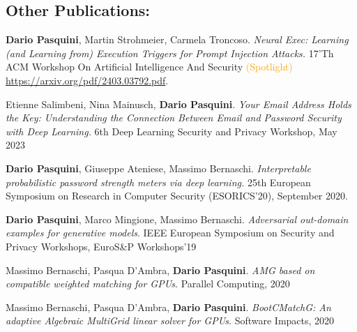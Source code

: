 \documentclass[margin, 10pt]{article} %
\begin{document}



	
\subsection*{Other Publications:}
\vspace{.5cm}


\begin{thebibliography}{99}
\setcounter{enumiv}{7} 

	\textbf{Dario Pasquini},  Martin Strohmeier, Carmela Troncoso. \textit{Neural Exec: Learning (and Learning from) Execution Triggers for Prompt Injection Attacks.} 17'Th ACM Workshop On Artificial Intelligence And Security \textcolor{orange}{(Spotlight)} \url{https://arxiv.org/pdf/2403.03792.pdf}.

	
	Etienne Salimbeni, Nina Mainusch, \textbf{Dario Pasquini}. \textit{Your Email Address Holds the Key: Understanding the Connection Between Email and Password Security with Deep Learning.} 6th Deep Learning Security and Privacy Workshop, May 2023

\textbf{Dario Pasquini}, Giuseppe Ateniese, Massimo Bernaschi. \textit{Interpretable probabilistic password strength meters via deep learning.}  25th European Symposium on Research in Computer Security (\mbox{ESORICS}'20), September 2020. 

  \textbf{Dario Pasquini}, Marco Mingione,  Massimo Bernaschi. \textit{Adversarial out-domain examples for generative models}. IEEE European Symposium on Security and Privacy Workshops, EuroS\&P Workshops'19

Massimo Bernaschi, Pasqua D’Ambra,  \textbf{Dario Pasquini}.\textit{ AMG based on compatible weighted matching for GPUs}. Parallel Computing, 2020

 Massimo Bernaschi, Pasqua D’Ambra,  \textbf{Dario Pasquini}.\textit{ BootCMatchG: An adaptive Algebraic MultiGrid linear solver for GPUs}. Software Impacts, 2020
\end{thebibliography}
\end{document}
